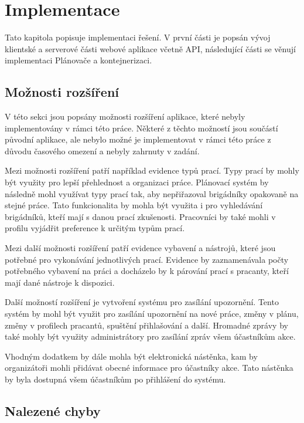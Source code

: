 \chapter{Implementace}

Tato kapitola popisuje implementaci řešení. V první části je popsán vývoj klientské a serverové části webové aplikace včetně API, následující části se 
věnují implementaci Plánovače a kontejnerizaci.






\section{Možnosti rozšíření}

V této sekci jsou popsány možnosti rozšíření aplikace, které nebyly implementovány v rámci této práce. Některé z těchto možností jsou součástí původní aplikace,
ale nebylo možné je implementovat v rámci této práce z důvodu časového omezení a nebyly zahrnuty v zadání.

Mezi možnosti rozšíření patří například evidence typů prací. Typy prací by mohly být využity pro lepší přehlednost a organizaci práce. Plánovací
systém by následně mohl využívat typy prací tak, aby nepřiřazoval brigádníky opakovaně na stejné práce. Tato funkcionalita by mohla být využita i pro
vyhledávání brigádníků, kteří mají s danou prací zkušenosti. Pracovníci by také mohli v profilu vyjádřit preference k určitým typům prací.

Mezi další možnosti rozšíření patří evidence vybavení a nástrojů, které jsou potřebné pro vykonávání jednotlivých prací. Evidence by zaznamenávala
počty potřebného vybavení na práci a docházelo by k párování prací s pracanty, kteří mají dané nástroje k dispozici.

Další možností rozšíření je vytvoření systému pro zasílání upozornění. Tento systém by mohl být využit pro zasílání upozornění na nové práce, změny
v plánu, změny v profilech pracantů, spuštění přihlašování a další. Hromadné zprávy by také mohly být využity administrátory pro zasílání zpráv všem
účastníkům akce.

Vhodným dodatkem by dále mohla být elektronická nástěnka, kam by organizátoři mohli přidávat obecné informace pro účastníky akce. Tato nástěnka by
byla dostupná všem účastníkům po přihlášení do systému.

\section{Nalezené chyby}

